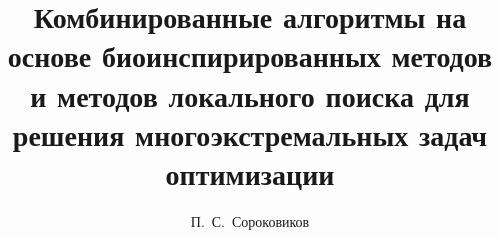 


\usepackage[russian]{nla}

%
%


%




%
\fi

\title{Комбинированные алгоритмы на основе биоинспирированных методов и методов локального поиска для решения многоэкстремальных задач оптимизации}
\author{П.~С.~Сороковиков
} %


\maketitle

